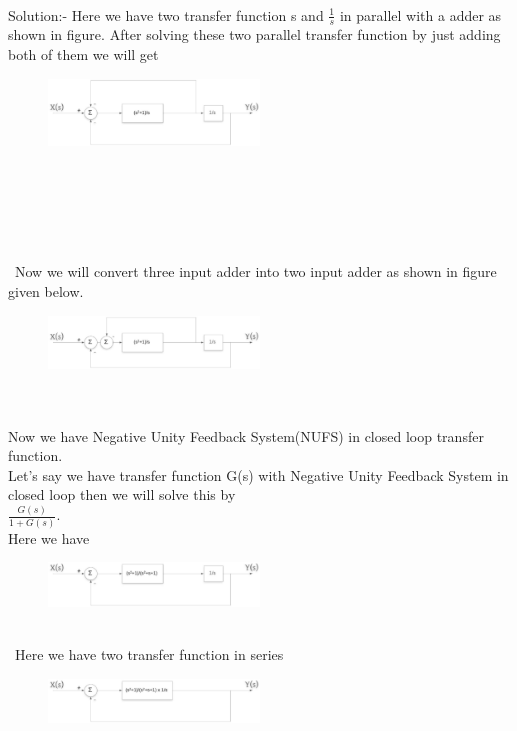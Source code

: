 \documentclass[journal,12pt,twocolumn]{IEEEtran}
\begin{document}
\\
\begin{frame}{Solution:- }
Here we have two transfer function s and $\frac{1}{s}$ in parallel with a adder as shown in figure.
After solving these two parallel transfer function by just adding both of them we will get
\begin{figure}[h]
\includegraphics[width=0.5\textwidth]{./figs/pic2.eps}
\end{figure}
\\\\\\\\\\\
Now we will convert three input adder into two input adder as shown in figure given below.
\begin{figure}[h]
\includegraphics[width=0.5\textwidth]{./figs/pic3.eps}
\end{figure}
\\\\
Now we have Negative Unity Feedback System(NUFS) in closed loop transfer function. \\Let's say we have transfer function G(s) with Negative Unity Feedback System in closed loop then we will solve this by\\              $\frac{G(s)}{1+G(s)}$.
\\Here we have
\begin{figure}[h]
\includegraphics[width=0.5\textwidth]{./figs/pic4.eps}
\end{figure}
\\\
Here we have two transfer function in series 
\begin{figure}[h]
\includegraphics[width=0.5\textwidth]{./figs/pic5.eps}

\end{figure}
\end{frame}
\end{document}
